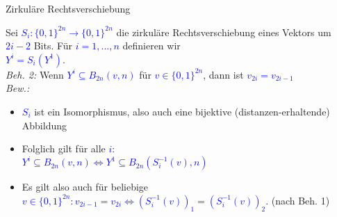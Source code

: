 \documentclass[10pt, aspectratio=169]{beamer}
\begin{document}
\begin{frame}[label = {Versch}]{Zirkuläre Rechtsverschiebung}
\begin{minipage}[t]{0.7\textwidth}
    Sei \textcolor{blue}{$S_i: \{0,1\}^{2n} \rightarrow \{0,1\}^{2n}$} die zirkuläre Rechtsverschiebung eines Vektors um \textcolor{blue}{$2i-2$} Bits.
    Für \textcolor{blue}{$i=1,...,n$} definieren wir\\
    \textcolor{blue}{$Y^i = S_i(Y^1)$}.\vspace{1em}\\
    \textit{Beh. 2:} Wenn \textcolor{blue}{$Y^i \subseteq B_{2n}(v,n)$} für \textcolor{blue}{$v \in \{0,1\}^{2n}$}, dann ist \textcolor{blue}{$v_{2i} = v_{2i-1}$}\\
\textit{Bew.:}
\begin{itemize}
    \item \textcolor{blue}{$S_i$} ist ein Isomorphismus, also auch eine bijektive (distanzen-erhaltende) Abbildung
    \item Folglich gilt für alle \textcolor{blue}{$i$}:\\ \textcolor{blue}{$Y^i \subseteq B_{2n}(v,n) \Leftrightarrow Y^1 \subseteq B_{2n}(S_i^{-1}(v),n)$}
    \item Es gilt also auch für beliebige \textcolor{blue}{$v \in \{0,1\}^{2n}: v_{2i-1}=v_{2i} \Leftrightarrow (S_i^{-1}(v))_1 = (S_i^{-1}(v))_2$}. (nach Beh. 1)
\end{itemize}

\end{minipage}
\end{frame}
\end{document}
